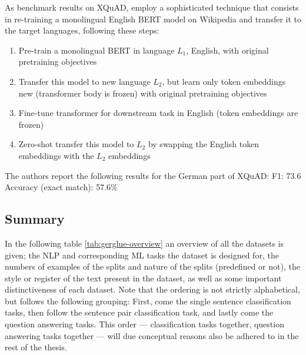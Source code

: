 



As benchmark results on XQuAD, \citeauthor{artetxe2019cross} employ a sophisticated technique
that consists in re-training a monolingual English BERT model on Wikipedia and transfer it to the
target languages, following these steps:

\begin{enumerate}
    \item Pre-train a monolingual BERT in language $L_1$, English, with original pretraining objectives
    \item Transfer this model to new language $L_2$, but learn only token embeddings new (transformer body is frozen) with original pretraining objectives
    \item Fine-tune transformer for downstream task in English (token embeddings are frozen)
    \item Zero-shot transfer this model to $L_2$ by swapping the English token embeddings with the $L_2$ embeddings
\end{enumerate}

The authors report the following results for the German part of XQuAD:
F1: 73.6
Accuracy (exact match): 57.6\%

\subsection{Summary}

In the following table \ref{tab:gerglue-overview} an overview of all the datasets is given;
the NLP and corresponding ML tasks the dataset is designed for, the numbers of examples of
the splits and nature of the splits (predefined or not), the style or register of the text
present in the dataset, as well as some important distinctiveness of each dataset. Note that
the ordering is not strictly alphabetical, but follows the following grouping: First, come the
single sentence classification tasks, then follow the sentence pair classification task,
and lastly come the question answering tasks. This order --- classification tasks together,
question answering tasks together --- will due conceptual reasons also be adhered to in the
rest of the thesis.

